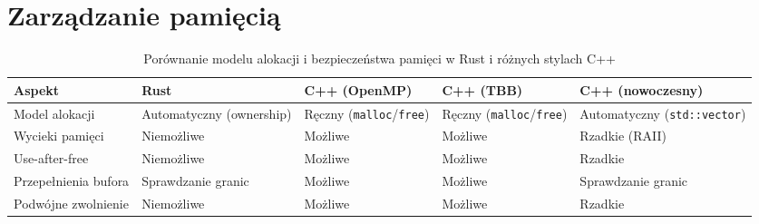 \section{Zarządzanie pamięcią}
\begin{table}[H]
    \centering
    \caption{Porównanie modelu alokacji i bezpieczeństwa pamięci w Rust i różnych stylach C++}
    \begin{tabularx}{\textwidth}{lXXXX}
    \toprule
    \textbf{Aspekt} &
    \textbf{Rust} &
    \textbf{C++ (OpenMP)} &
    \textbf{C++ (TBB)} &
    \textbf{C++ (nowoczesny)} \\
    \midrule
    Model alokacji &
    Automatyczny (ownership) &
    Ręczny (\texttt{malloc}/\texttt{free}) &
    Ręczny (\texttt{malloc}/\texttt{free}) &
    Automatyczny (\texttt{std::vector}) \\
    
    Wycieki pamięci &
    Niemożliwe &
    Możliwe &
    Możliwe &
    Rzadkie (RAII) \\
    
    Use-after-free &
    Niemożliwe &
    Możliwe &
    Możliwe &
    Rzadkie \\
    
    Przepełnienia bufora &
    Sprawdzanie granic &
    Możliwe &
    Możliwe &
    Sprawdzanie granic \\
    
    Podwójne zwolnienie &
    Niemożliwe &
    Możliwe &
    Możliwe &
    Rzadkie \\
    \bottomrule
    \end{tabularx}
\end{table}
